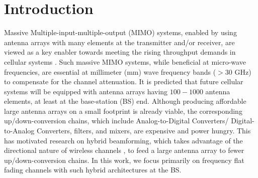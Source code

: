 \documentclass[journal,comsoc]{IEEEtran}
\begin{document}
\maketitle


\IEEEdisplaynontitleabstractindextext







%
\IEEEpeerreviewmaketitle

\section{Introduction} \label{introduction}
Massive Multiple-input-multiple-output (MIMO) systems, enabled by using antenna arrays with many elements at the transmitter and/or receiver, are viewed as a key enabler towards meeting the rising throughput demands in cellular systems \cite{Marzetta, Keytech_5G}. Such massive MIMO systems, while beneficial at micro-wave frequencies, are essential at millimeter (mm) wave frequency bands ($>30$ GHz) to compensate for the channel attenuation. 
%
%
It is predicted that future cellular systems will be equipped with antenna arrays having $100-1000$ antenna elements, at least at the base-station (BS) end. Although producing affordable large antenna arrays on a small footprint is already viable, the corresponding up/down-conversion chains, which include Analog-to-Digital Converters/ Digital-to-Analog Converters, filters, and mixers, are expensive and power hungry. 
This has motivated research on hybrid beamforming, which takes advantage of the directional nature of wireless channels \cite{Pedersen2000, molisch2014propagation, Akdeniz, Haneda2016}, to feed a large antenna array to fewer up/down-conversion chains. In this work, we focus primarily on frequency flat fading channels with such hybrid architectures at the BS. 
%
\end{document}
